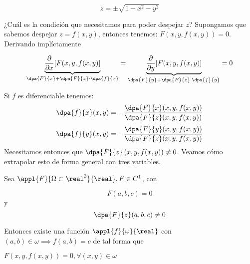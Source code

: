 \[ z = \pm \sqrt{1 - x^2 - y^2} \]

¿Cuál es la condición que necesitamos para poder despejar $z$? Supongamos que sabemos despejar $z=f(x,y)$, entonces tenemos: $F(x,y,f(x,y)) = 0$. Derivando implíctamente

\[ \underbrace{\frac{\partial}{\partial x} [F(x,y,f(x,y)]}_{\dpa{F}{x} + \dpa{F}{z}\cdot\dpa{f}{x}}= \underbrace{\frac{\partial}{\partial y} [F(x,y,f(x,y)]}_{\dpa{F}{y} + \dpa{F}{z}\cdot\dpa{f}{y}} = 0 \]

Si $f$ es diferenciable tenemos:
$$\dpa{f}{x}(x,y) = - \frac{\dpa{F}{x}(x,y,f(x,y))}{\dpa{F}{z}(x,y,f(x,y))}$$
$$\dpa{f}{y}(x,y) = - \frac{\dpa{F}{y}(x,y,f(x,y))}{\dpa{F}{z}(x,y,f(x,y))}$$
Necesitamos entonces que $\displaystyle\dpa{F}{z}\left(x,y,f(x,y)\right) \neq 0$. Veamos cómo extrapolar esto de forma general con tres variables.

\begin{theorem}

\label{TFImp}

Sea $\appl{F}{\Omega\subset\real^3}{\real}, F\in C^1$, con

\[ F(a,b,c) = 0 \] y \[ \dpa{F}{z}(a,b,c)\neq 0 \]

Entonces existe una función $\appl{f}{\omega}{\real}$ con $(a,b)\in \omega \implies  f(a,b) = c$ de tal forma que

$F(x,y,f(x,y)) = 0, \forall(x,y)\in \omega$

\end{theorem}

